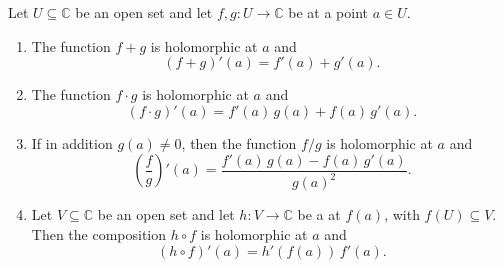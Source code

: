 \begin{proposition} \label{proposition:proposition_sum_rule_product_rule_quotient_rule_chain_rule_for_complex_derivatives_of_holomorphic_functions_on_open_subsets_of_the_complex_plane}
Let $U \subseteq \mathbb{C}$ be an open set and let $f, g : U \to \mathbb{C}$ be  at a point $a \in U$.

\begin{enumerate}
    \item[\textbf{(Sum rule)}] The function $f + g$ is holomorphic at $a$ and
    $$(f + g)'(a) = f'(a) + g'(a).$$

    \item[\textbf{(Product rule)}] The function $f \cdot g$ is holomorphic at $a$ and
    $$(f \cdot g)'(a) = f'(a)\,g(a) + f(a)\,g'(a).$$

    \item[\textbf{(Quotient rule)}] If in addition $g(a) \neq 0$, then the function $f/g$ is holomorphic at $a$ and
    $$\left(\frac{f}{g}\right)'(a) = \frac{f'(a)\,g(a) - f(a)\,g'(a)}{g(a)^2}.$$

    \item[\textbf{(Chain rule)}] Let $V \subseteq \mathbb{C}$ be an open set and let $h : V \to \mathbb{C}$ be a  at $f(a)$, with $f(U) \subseteq V$. Then the composition $h \circ f$ is holomorphic at $a$ and
    $$(h \circ f)'(a) = h'(f(a))\,f'(a).$$
\end{enumerate}
\end{proposition}

